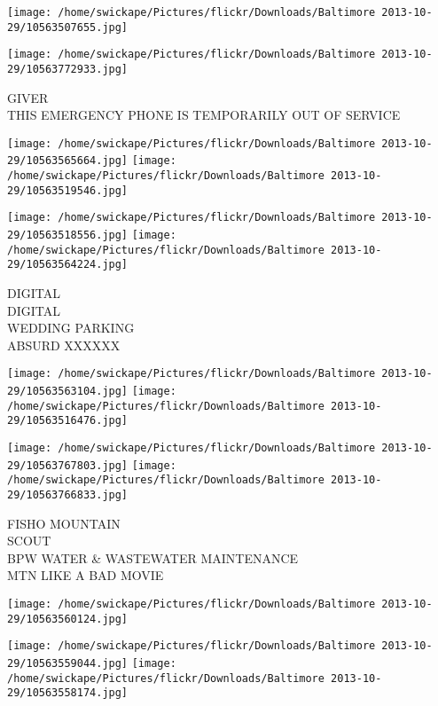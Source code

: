 \documentclass[10pt,letterpaper]{article}
\begin{document}
\texttt{[image: /home/swickape/Pictures/flickr/Downloads/Baltimore 2013-10-29/10563507655.jpg]}

\vspace{0.25in}
\texttt{[image: /home/swickape/Pictures/flickr/Downloads/Baltimore 2013-10-29/10563772933.jpg]}

GIVER\\
THIS EMERGENCY PHONE IS TEMPORARILY OUT OF SERVICE\\
\pagebreak

\texttt{[image: /home/swickape/Pictures/flickr/Downloads/Baltimore 2013-10-29/10563565664.jpg]}
\texttt{[image: /home/swickape/Pictures/flickr/Downloads/Baltimore 2013-10-29/10563519546.jpg]}

\texttt{[image: /home/swickape/Pictures/flickr/Downloads/Baltimore 2013-10-29/10563518556.jpg]}
\texttt{[image: /home/swickape/Pictures/flickr/Downloads/Baltimore 2013-10-29/10563564224.jpg]}

DIGITAL\\
DIGITAL\\
WEDDING PARKING\\
ABSURD XXXXXX\\
\pagebreak

\texttt{[image: /home/swickape/Pictures/flickr/Downloads/Baltimore 2013-10-29/10563563104.jpg]}
\texttt{[image: /home/swickape/Pictures/flickr/Downloads/Baltimore 2013-10-29/10563516476.jpg]}

\texttt{[image: /home/swickape/Pictures/flickr/Downloads/Baltimore 2013-10-29/10563767803.jpg]}
\texttt{[image: /home/swickape/Pictures/flickr/Downloads/Baltimore 2013-10-29/10563766833.jpg]}

FISHO MOUNTAIN\\
SCOUT\\
BPW WATER \& WASTEWATER MAINTENANCE\\
MTN LIKE A BAD MOVIE\\
\pagebreak

\texttt{[image: /home/swickape/Pictures/flickr/Downloads/Baltimore 2013-10-29/10563560124.jpg]}

\vspace{0.25in}
\texttt{[image: /home/swickape/Pictures/flickr/Downloads/Baltimore 2013-10-29/10563559044.jpg]}
\texttt{[image: /home/swickape/Pictures/flickr/Downloads/Baltimore 2013-10-29/10563558174.jpg]}
\end{document}
